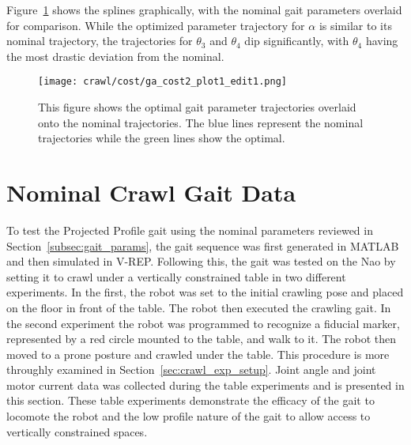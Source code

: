 Figure~\ref{fig:optimal_gait_parameters} shows the splines graphically, with the nominal gait parameters
overlaid for comparison. While the optimized parameter trajectory for $\alpha$ is similar to its nominal
trajectory, the trajectories for $\theta_3$ and $\theta_4$ dip significantly, with $\theta_4$ having the
most drastic deviation from the nominal.

\begin{figure}
\centering
\texttt{[image: crawl/cost/ga\_cost2\_plot1\_edit1.png]}  
\caption{This figure shows the optimal gait parameter trajectories overlaid onto the nominal
         trajectories. The blue lines represent the nominal trajectories while the green
         lines show the optimal.}
\label{fig:optimal_gait_parameters}
\end{figure}




\FloatBarrier
\section{Nominal Crawl Gait Data} \label{sec:nom_crawl_data}

To test the Projected Profile gait using the nominal parameters reviewed in 
Section~\ref{subsec:gait_params}, the gait sequence was first generated in
MATLAB and then simulated in V-REP\@. Following this, the gait was tested on the
Nao by setting it to crawl under a vertically constrained table in two different
experiments. In the first, the robot was set to the initial crawling pose and
placed on the floor in front of the table. The robot then executed the crawling gait.
In the second experiment the robot was programmed to recognize a fiducial marker,
represented by a red circle mounted to the table, and walk to it. 
The robot then moved to a prone posture and crawled under the table. This procedure
is more throughly examined in Section~\ref{sec:crawl_exp_setup}. Joint angle and joint
motor current data was collected during the table experiments and is presented in this section.
These table experiments demonstrate the efficacy of the gait to locomote the robot
and the low profile nature of the gait to allow access to vertically constrained spaces.

